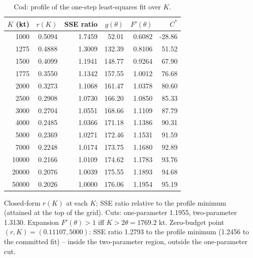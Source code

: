 \begin{table}[H]
\centering
\caption{Cod: profile of the one-step least-squares fit over $K$.}
\label{tab:si-profile}
\small
\begin{tabular}{rrrrrr}
\toprule
$K$ (kt) & $r(K)$ & SSE ratio & $g(\theta)$ & $F'(\theta)$ & $C^*$ \\
\midrule
1000 & 0.5094 & 1.7459 & 52.01 & 0.6082 & -28.86 \\
1275 & 0.4888 & 1.3009 & 132.39 & 0.8106 & 51.52 \\
1500 & 0.4099 & 1.1941 & 148.77 & 0.9264 & 67.90 \\
1775 & 0.3550 & 1.1342 & 157.55 & 1.0012 & 76.68 \\
2000 & 0.3273 & 1.1068 & 161.47 & 1.0378 & 80.60 \\
2500 & 0.2908 & 1.0730 & 166.20 & 1.0850 & 85.33 \\
3000 & 0.2704 & 1.0551 & 168.66 & 1.1109 & 87.79 \\
4000 & 0.2485 & 1.0366 & 171.18 & 1.1386 & 90.31 \\
5000 & 0.2369 & 1.0271 & 172.46 & 1.1531 & 91.59 \\
7000 & 0.2248 & 1.0174 & 173.75 & 1.1680 & 92.89 \\
10000 & 0.2166 & 1.0109 & 174.62 & 1.1783 & 93.76 \\
20000 & 0.2076 & 1.0039 & 175.55 & 1.1893 & 94.68 \\
50000 & 0.2026 & 1.0000 & 176.06 & 1.1954 & 95.19 \\
\bottomrule
\end{tabular}
\par\smallskip\begin{minipage}{0.97\linewidth}\footnotesize Closed-form $r(K)$ at each $K$; SSE ratio relative to the profile minimum (attained at the top of the grid). Cuts: one-parameter 1.1955, two-parameter 1.3130. Expansion $F'(\theta)>1$ iff $K>2\theta=1769.2$ kt. Zero-budget point $(r,K)=(0.11107,5000)$: SSE ratio 1.2793 to the profile minimum (1.2456 to the committed fit) -- inside the two-parameter region, outside the one-parameter cut.\end{minipage}
\end{table}
